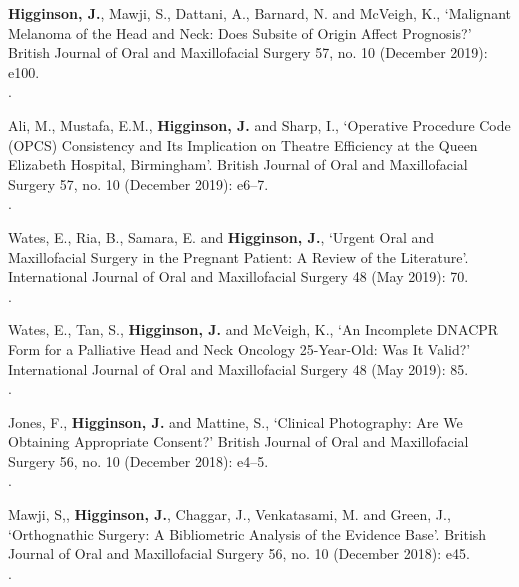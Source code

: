 \vspace{0.1cm}

 \textbf{Higginson, J.}, Mawji, S., Dattani, A., Barnard, N. and McVeigh, K., `Malignant Melanoma of the Head and Neck: Does Subsite of Origin Affect Prognosis?’ British Journal of Oral and Maxillofacial Surgery 57, no. 10 (December 2019): e100. 
\\.

\vspace{0.1cm}

 Ali, M., Mustafa, E.M., \textbf{Higginson, J.} and Sharp, I., `Operative Procedure Code (OPCS) Consistency and Its Implication on Theatre Efficiency at the Queen Elizabeth Hospital, Birmingham’. British Journal of Oral and Maxillofacial Surgery 57, no. 10 (December 2019): e6–7. 
\\.

\vspace{0.1cm}

 Wates, E., Ria, B., Samara, E. and \textbf{Higginson, J.}, `Urgent Oral and Maxillofacial Surgery in the Pregnant Patient: A Review of the Literature’. International Journal of Oral and Maxillofacial Surgery 48 (May 2019): 70. 
\\.

\vspace{0.1cm}

 Wates, E., Tan, S., \textbf{Higginson, J.} and McVeigh, K., `An Incomplete DNACPR Form for a Palliative Head and Neck Oncology 25-Year-Old: Was It Valid?’ International Journal of Oral and Maxillofacial Surgery 48 (May 2019): 85. 
\\.

\vspace{0.1cm}

 Jones, F., \textbf{Higginson, J.} and Mattine, S., `Clinical Photography: Are We Obtaining Appropriate Consent?’ British Journal of Oral and Maxillofacial Surgery 56, no. 10 (December 2018): e4–5. 
\\.

\vspace{0.1cm}

 Mawji, S,, \textbf{Higginson, J.}, Chaggar, J.,  Venkatasami, M. and Green, J., `Orthognathic Surgery: A Bibliometric Analysis of the Evidence Base’. British Journal of Oral and Maxillofacial Surgery 56, no. 10 (December 2018): e45. 
\\.

